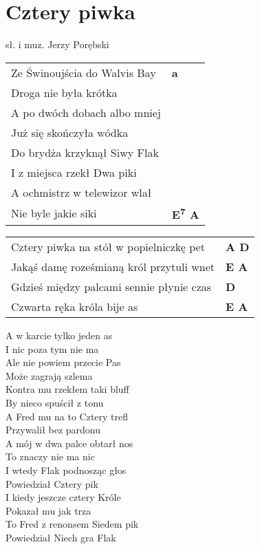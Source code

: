 \section{Cztery piwka}

sł. i muz. Jerzy Porębski\\

\vspace{2em}
\begin{tabular}{@{}p{10cm}@{}l@{}}
Ze Świnoujścia do Walvis Bay & \bfseries a\\
Droga nie była krótka \\
A po dwóch dobach albo mniej \\
Już się skończyła wódka \\
Do brydża krzyknął Siwy Flak \\
I z miejsca rzekł Dwa piki \\
A ochmistrz w telewizor wlał \\
Nie byle jakie siki & \bfseries E\textsuperscript{7} A\\
\end{tabular}

\begin{tabular}{@{}p{10cm}@{}l@{}}
Cztery piwka na stół w popielniczkę pet & \bfseries A D\\
Jakąś damę roześmianą król przytuli wnet & \bfseries E A\\
Gdzieś między palcami sennie płynie czas & \bfseries D\\
Czwarta ręka króla bije as & \bfseries E A\\
\end{tabular}

\vspace{1em}
A w karcie tylko jeden as \\
I nic poza tym nie ma \\
Ale nie powiem przecie Pas \\
Może zagrają szlema \\
Kontra mu rzekłem taki bluff \\
By nieco spuścił z tonu \\
A Fred mu na to Cztery trefl \\
Przywalił bez pardonu \\

A mój w dwa palce obtarł nos \\
To znaczy nie ma nic \\
I wtedy Flak podnosząc głos \\
Powiedział Cztery pik \\
I kiedy jeszcze cztery Króle \\
Pokazał mu jak trza \\
To Fred z renonsem Siedem pik \\
Powiedział Niech gra Flak \\

